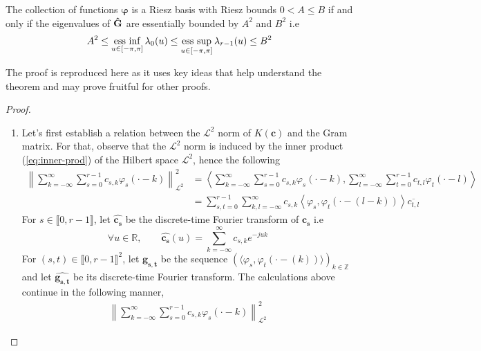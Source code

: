 \begin{thm}\label{thm:Riesz-Gram} The collection of functions $\bm{\varphi}$ is a Riesz 
  basis with Riesz bounds $0 < A \leq B$ if and only if the eigenvalues of $\mathbf{\hat{G}}$ are essentially bounded by 
  $A^2$ and $B^2$ i.e
  \begin{equation} A^2 \leq \operatorname*{ess\ inf}_{u \in [-\pi, \pi]} \lambda_{0}(u) \leq \operatorname*{ess\ sup}_{u \in [-\pi, \pi]} \lambda_{r-1}(u) 
    \leq B^2
  \end{equation}
\end{thm}

The proof is reproduced here as it uses key ideas that help understand the theorem and may prove fruitful for other 
proofs.
\begin{proof}
  \begin{enumerate}
    \item
      Let's first establish a relation between the $\mathcal{L}^2$ norm of $K(\bm{c})$ and the Gram matrix. For that, 
      observe that the $\mathcal{L}^2$ norm is induced by the inner product (\ref{eq:inner-prod}) of the Hilbert space 
      $\mathcal{L}^2$, hence the following
      \begin{align*}
	{\left\| \sum_{k=-\infty}^{\infty} \sum_{s=0}^{r-1} c_{s,k} \varphi_s(\cdot-k)\right\|}_{\mathcal{L}^2}^2 &= 
	\left\langle  \sum_{k=-\infty}^{\infty} \sum_{s=0}^{r-1} c_{s,k} \varphi_s(\cdot-k), \sum_{l=-\infty}^{\infty} 
	\sum_{t=0}^{r-1} c_{t,l} \varphi_t(\cdot-l) \right\rangle \\
	& = \sum_{s,t=0}^{r-1} \sum_{k,l=-\infty}^{\infty}  c_{s,k} \left\langle \varphi_s, \varphi_t(\cdot-(l-k)) 
	\right\rangle \overline{c_{t,l}}
      \end{align*}
      For $s \in \llbracket0, r-1\rrbracket$, let $\widehat{\bm{c_s}}$ be the discrete-time Fourier transform of $\bm{c_s}$ 
      i.e
      \begin{equation*}
	\forall u \in \mathbb{R}, \qquad \widehat{\bm{c_s}}(u) = \sum_{k=-\infty}^{\infty} c_{s,k} e^{-juk}
      \end{equation*}
      For $(s,t) \in {\llbracket0, r-1\rrbracket}^2$, let $\bm{g_{s,t}}$ be the sequence ${\left(\langle \varphi_s, 
      \varphi_t(\cdot-(k))\rangle\right)}_{k \in \mathbb{Z}}$ and let $\widehat{\bm{g_{s,t}}}$ be its discrete-time Fourier 
      transform. The calculations above continue in the following manner,
      \begin{align*}
	{\left\| \sum_{k=-\infty}^{\infty} \sum_{s=0}^{r-1} c_{s,k} \varphi_s(\cdot-k)\right\|}_{\mathcal{L}^2}^2

\end{align*}
\end{enumerate}
\end{proof}
